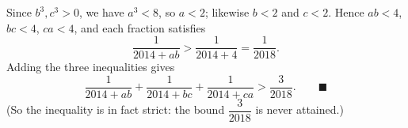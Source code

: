 Since $b^3,c^3>0$, we have $a^3<8$, so $a<2$; likewise $b<2$ and $c<2$. Hence $ab<4$, $bc<4$, $ca<4$, and each fraction satisfies
\[\dfrac1{2014+ab}>\dfrac1{2014+4}=\dfrac1{2018}.\]
Adding the three inequalities gives
\[\dfrac{1}{2014+ab}+\dfrac{1}{2014+bc}+\dfrac{1}{2014+ca}>\dfrac{3}{2018}.\qquad\blacksquare\]
(So the inequality is in fact strict: the bound $\dfrac{3}{2018}$ is never attained.)
